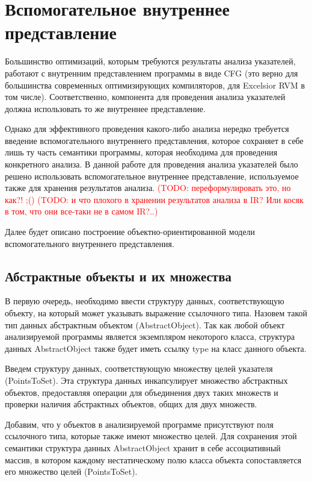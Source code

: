 \documentclass[14pt,titlepage]{extarticle}
\newcommand{\todo}[1]{\textcolor{red}{(\eng{TODO}: #1)}}
\newcommand{\eng}[1]{{\English#1}}
\let\oldsection\section
\renewcommand{\section}{\newpage\oldsection}
\begin{document}
  \section{Вспомогательное внутреннее представление}
    \label{section:analysis_aux_ir}

    Большинство оптимизаций, которым требуются результаты анализа указателей,
    работают с внутренним представлением программы в виде CFG (это верно для
    большинства современных оптимизирующих компиляторов, для \eng{Excelsior}
    RVM в том числе). Соответственно, компонента для проведения анализа
    указателей должна использовать то же внутреннее представление.

    Однако для эффективного проведения какого-либо анализа нередко требуется
    введение вспомогательного внутреннего представления, которое сохраняет в
    себе лишь ту часть семантики программы, которая необходима для проведения
    конкретного анализа. В данной работе для проведения анализа указателей было
    решено использовать вспомогательное внутреннее представление, используемое
    также для хранения результатов анализа.
    \todo{переформулировать это, но как?! ;(}
    \todo{и что плохого в хранении результатов анализа в IR?
          Или косяк в том, что они все-таки не в самом IR?..}

    Далее будет описано построение объектно-ориентированной модели
    вспомогательного внутреннего представления.

    \subsection{Абстрактные объекты и их множества}

      В первую очередь, необходимо ввести структуру данных, соответствующую
      объекту, на который может указывать выражение ссылочного типа. Назовем
      такой тип данных абстрактным объектом (\eng{AbstractObject}). Так как
      любой объект анализируемой программы является экземпляром некоторого
      класса, структура данных \eng{AbstractObject} также будет иметь ссылку
      \eng{type} на класс данного объекта.

      Введем структуру данных, соответствующую множеству целей указателя
      (\eng{Points\-To\-Set}). Эта структура данных инкапсулирует
      множество абстрактных объектов, предоставляя операции для объединения двух
      таких множеств и проверки наличия абстрактных объектов, общих для двух
      множеств.

      Добавим, что у объектов в анализируемой программе присутствуют поля
      ссылочного типа, которые также имеют множество целей. Для сохранения
      этой семантики структура данных \eng{AbstractObject} хранит в себе
      ассоциативный массив, в котором каждому нестатическому полю класса объекта
      сопоставляется его множество целей (\eng{PointsToSet}).
\end{document}
